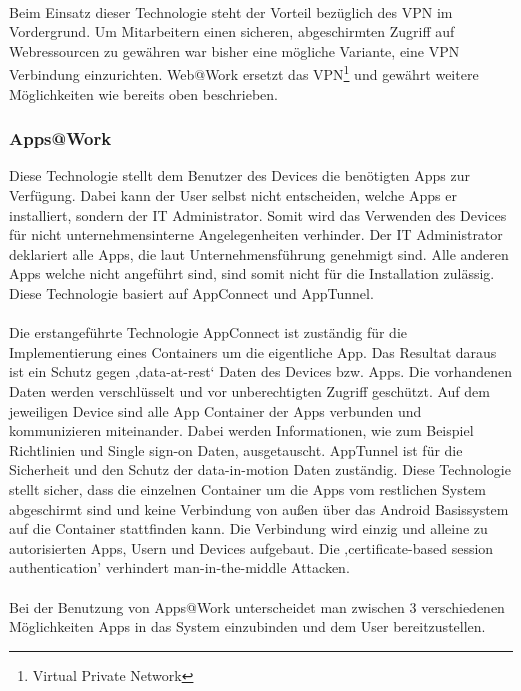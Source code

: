 \paragraph*{}
Beim Einsatz dieser Technologie steht der Vorteil bezüglich des VPN im Vordergrund. Um Mitarbeitern einen sicheren, abgeschirmten Zugriff auf Webressourcen zu gewähren war bisher eine mögliche Variante, eine VPN Verbindung einzurichten. Web@Work ersetzt das VPN\footnote{Virtual Private Network} und gewährt weitere Möglichkeiten wie bereits oben beschrieben.

\subsubsection{Apps@Work}
Diese Technologie stellt dem Benutzer des Devices die benötigten Apps zur Verfügung. Dabei kann der User selbst nicht entscheiden, welche Apps er installiert, sondern der IT Administrator. Somit wird das Verwenden des Devices für nicht unternehmensinterne Angelegenheiten verhinder. Der IT Administrator deklariert alle Apps, die laut Unternehmensführung genehmigt sind. Alle anderen Apps welche nicht angeführt sind, sind somit nicht für die Installation zulässig. Diese Technologie basiert auf AppConnect und AppTunnel.
\paragraph*{}
Die erstangeführte Technologie AppConnect ist zuständig für die Implementierung eines Containers um die eigentliche App. Das Resultat daraus ist ein Schutz gegen ‚data-at-rest‘ Daten des Devices bzw. Apps. Die vorhandenen Daten werden verschlüsselt und vor unberechtigten Zugriff geschützt. Auf dem jeweiligen Device sind alle App Container der Apps verbunden und kommunizieren miteinander. Dabei werden Informationen, wie zum Beispiel Richtlinien und Single sign-on Daten, ausgetauscht. \newline
AppTunnel ist für die Sicherheit und den Schutz der data-in-motion Daten zuständig. Diese Technologie stellt sicher, dass die einzelnen Container um die Apps vom restlichen System abgeschirmt sind und keine Verbindung von außen über das Android Basissystem auf die Container stattfinden kann. Die Verbindung wird einzig und alleine zu autorisierten Apps, Usern und Devices aufgebaut. Die ‚certificate-based session authentication’ verhindert man-in-the-middle Attacken.
\paragraph*{}
Bei der Benutzung von Apps@Work unterscheidet man zwischen 3 verschiedenen Möglichkeiten Apps in das System einzubinden und dem User bereitzustellen.
